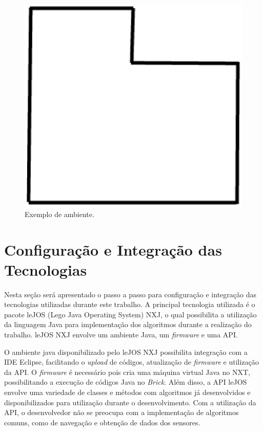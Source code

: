 	\begin{figure}[H]
		\centering
		\includegraphics[scale=0.5]{figuras/exemplo_ambiente.eps}
		\caption[Exemplo de ambiente]{Exemplo de ambiente.}
		\label{img:exemplo_ambiente}
	\end{figure}

\section{Configuração e Integração das Tecnologias}

Nesta seção será apresentado o passo a passo para configuração e integração das tecnologias utilizadas durante este trabalho. A principal tecnologia utilizada é o pacote leJOS (Lego Java Operating System) NXJ, o qual possibilita a utilização da linguagem Java para implementação dos algoritmos durante a realização do trabalho. leJOS NXJ envolve um ambiente Java, um \textit{firmware} e uma API.

O ambiente java disponibilizado pelo leJOS NXJ possibilita integração com a IDE Eclipse, facilitando o \textit{upload} de códigos, atualização de \textit{firmware} e utilização da API. O \textit{firmware} é necessário pois cria uma máquina virtual Java no NXT, possibilitando a execução de códigos Java no \textit{Brick}. Além disso, a API leJOS envolve uma variedade de classes e métodos com algoritmos já desenvolvidos e disponibilizados para utilização durante o desenvolvimento. Com a utilização da API, o desenvolvedor não se preocupa com a implementação de algoritmos comuns, como de navegação e obtenção de dados dos sensores.

